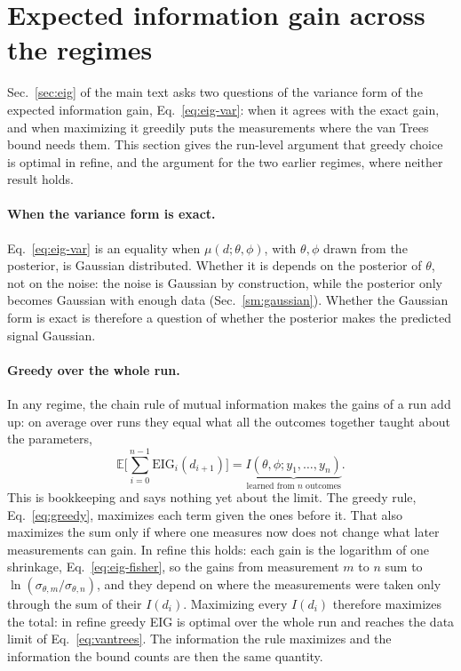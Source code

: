 \section{Expected information gain across the regimes}
\label{sm:eig}

Sec.~\ref{sec:eig} of the main text asks two questions of the variance form of the expected information gain,
Eq.~\eqref{eq:eig-var}: when it agrees with the exact gain, and when maximizing it greedily puts the
measurements where the van Trees bound needs them. This section gives the run-level argument that greedy choice is
optimal in refine, and the argument for the two earlier regimes, where neither result holds.

\paragraph{When the variance form is exact.} Eq.~\eqref{eq:eig-var} is an equality when $\mu(d;\theta,\phi)$, with
$\theta,\phi$ drawn from the posterior, is Gaussian distributed. Whether it is depends on the posterior of $\theta$,
not on the noise: the noise is Gaussian by construction, while the posterior only becomes Gaussian with enough data
(Sec.~\ref{sm:gaussian}). Whether the Gaussian form is exact is therefore a question of whether the posterior makes the predicted signal
Gaussian.

\paragraph{Greedy over the whole run.} In any regime, the chain rule of mutual information \cite{cover2006} makes
the gains of a run add up: on average over runs they equal what all the outcomes together taught about the
parameters,
\begin{equation}
  \mathbb E\Big[\sum_{i=0}^{n-1}\mathrm{EIG}_i(d_{i+1})\Big]
  =\underbrace{I(\theta,\phi;y_1,\dots,y_n)}_{\text{learned from }n\text{ outcomes}}.
  \label{eq:eig-sum}
\end{equation}
This is bookkeeping and says nothing yet about the limit. The greedy rule, Eq.~\eqref{eq:greedy}, maximizes each term
given the ones before it. That also maximizes the sum only if where one measures now does not change what later
measurements can gain. In refine this holds: each gain is the logarithm of one shrinkage, Eq.~\eqref{eq:eig-fisher},
so the gains from measurement $m$ to $n$ sum to $\ln(\sigma_{\theta,m}/\sigma_{\theta,n})$, and they depend on where the measurements
were taken only through the sum of their $I(d_i)$. Maximizing every $I(d_i)$ therefore maximizes the total: in refine
greedy EIG is optimal over the whole run and reaches the data limit of Eq.~\eqref{eq:vantrees}. The information the
rule maximizes and the information the bound counts are then the same quantity.

